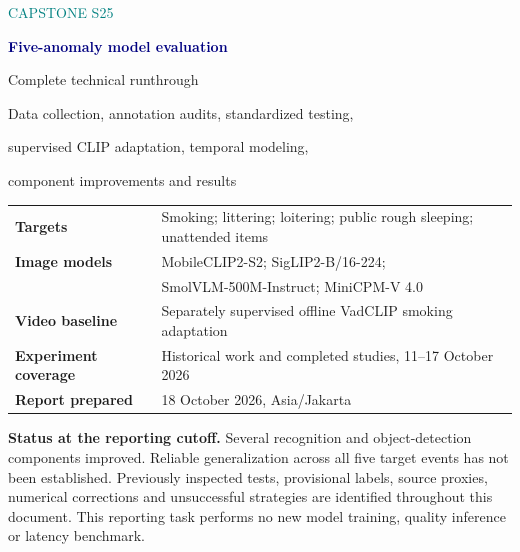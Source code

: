 \documentclass[11pt,a4paper,oneside]{report}
\begin{document}
\hypersetup{pageanchor=false}
\begin{titlepage}
\centering
\vspace*{18mm}
{\Large\textcolor{teal}{CAPSTONE S25}\par}
\vspace{12mm}
{\Huge\bfseries\textcolor{navy}{Five-anomaly model evaluation}\par}
\vspace{8mm}
{\LARGE Complete technical runthrough\par}
\vspace{9mm}
{\large Data collection, annotation audits, standardized testing,\par supervised CLIP adaptation, temporal modeling,\par component improvements and results\par}
\vspace{15mm}
\begin{tabularx}{\linewidth}{@{}lX@{}}
\textbf{Targets} & Smoking; littering; loitering; public rough sleeping; unattended items\\[5pt]
\textbf{Image models} & MobileCLIP2-S2; SigLIP2-B/16-224;\\
& SmolVLM-500M-Instruct; MiniCPM-V 4.0\\[5pt]
\textbf{Video baseline} & Separately supervised offline VadCLIP smoking adaptation\\[5pt]
\textbf{Experiment coverage} & Historical work and completed studies, 11--17 October 2026\\[5pt]
\textbf{Report prepared} & 18 October 2026, Asia/Jakarta
\end{tabularx}
\vfill
\begin{minipage}{0.91\linewidth}
\textbf{Status at the reporting cutoff.} Several recognition and object-detection components improved. Reliable generalization across all five target events has not been established. Previously inspected tests, provisional labels, source proxies, numerical corrections and unsuccessful strategies are identified throughout this document. This reporting task performs no new model training, quality inference or latency benchmark.
\end{minipage}
\vspace{12mm}
\end{titlepage}
\hypersetup{pageanchor=true}

\tableofcontents
\listoftables
\listoffigures
\clearpage
{}












\appendix

\end{document}
